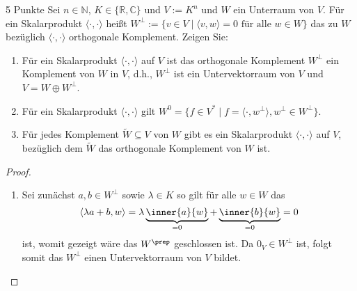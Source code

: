 \documentclass{problemset}
\author{Michael van Straten}
\begin{document}
\maketitle

\begin{problem}{5 Punkte}
Sei $n \in \mathbb{N}$, $K \in \{\mathbb{R}, \mathbb{C}\}$ und $V := K^n$ und
$W$ ein Unterraum von $V$. Für ein Skalarprodukt $\langle \cdot , \cdot
    \rangle$ heißt $W^\perp := \{v \in V \mid \langle v, w \rangle = 0 \text{ für
        alle } w \in W\}$ das zu $W$ bezüglich $\langle \cdot , \cdot \rangle$
orthogonale Komplement. Zeigen Sie:
\begin{enumerate}
    \item Für ein Skalarprodukt $\langle \cdot , \cdot \rangle$ auf $V$ ist das
          orthogonale Komplement $W^\perp$ ein Komplement von $W$ in $V$, d.h., $W^\perp$
          ist ein Untervektorraum von $V$ und $V = W \oplus W^\perp$.
    \item Für ein Skalarprodukt $\langle \cdot , \cdot \rangle$ gilt $W^0 = \{f \in V^*
              \mid f = \langle \cdot , w^\perp \rangle, w^\perp \in W^\perp\}$.
    \item Für jedes Komplement $\tilde{W} \subseteq V$ von $W$ gibt es ein Skalarprodukt
          $\langle \cdot , \cdot \rangle$ auf $V$, bezüglich dem $\tilde{W}$ das
          orthogonale Komplement von $W$ ist.
\end{enumerate}

\begin{proof} \hfill
    \begin{enumerate}
        \item Sei zunächst \(a, b \in W^\perp\) sowie \(\lambda \in K\) so gilt für alle \(w
              \in W\) das
              \begin{equation*}
                  \langle \lambda a + b, w \rangle = \lambda \underbrace{\inner{a}{w}}_{= 0} + \underbrace{\inner{b}{w}}_{=0} = 0
              \end{equation*}
              ist, womit gezeigt wäre das \(W^\prep\) geschlossen ist.
              Da \(0_V \in W^\perp\) ist, folgt somit das \(W^\perp\) einen
              Untervektorraum von \(V\) bildet.


\end{enumerate}
\end{proof}
\end{problem}
\end{document}
